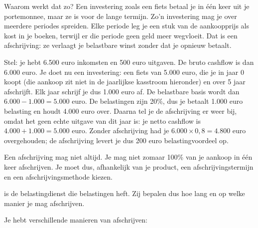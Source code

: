 \documentclass[a4paper,11pt]{article}
\begin{document}
Waarom werkt dat zo? Een investering zoals een fiets betaal je in één keer uit je portemonnee,
maar ze is voor de lange termijn. Zo'n investering mag je over
meerdere periodes spreiden. Elke periode leg je een stuk van de aankoopprijs als kost
in je boeken, terwijl er die periode geen geld meer wegvloeit.
Dat is een afschrijving: ze verlaagt je belastbare winst zonder dat je opnieuw betaalt.
\newline

Stel: je hebt 6.500 euro inkomsten en 500 euro uitgaven.
De bruto cashflow is dan 6.000 euro. Je doet nu een investering: een fiets van 5.000 euro,
die je in jaar 0 koopt (die aankoop zit niet in de jaarlijkse kasstroom hieronder)
en over 5 jaar afschrijft. Elk jaar schrijf je dus 1.000 euro af.
De belastbare basis wordt dan $6.000 - 1.000 = 5.000$ euro.
De belastingen zijn 20\%, dus je betaalt 1.000 euro belasting en houdt 4.000 euro over.
Daarna tel je de afschrijving er weer bij, omdat het geen echte uitgave van dit jaar is:
je netto cashflow is $4.000 + 1.000 = 5.000$ euro.
Zonder afschrijving had je $6.000 \times 0{,}8 = 4.800$ euro overgehouden;
de afschrijving levert je dus 200 euro belastingvoordeel op.
\newline

Een afschrijving mag niet altijd. Je mag niet zomaar 100\% van je aankoop in één keer afschrijven.
Je moet dus, afhankelijk van je product, een afschrijvingstermijn en een afschrijvingsmethode kiezen.
\newline

 is de belastingdienst die belastingen heft.
Zij bepalen dus hoe lang en op welke manier je mag afschrijven.
\newline

Je hebt verschillende manieren van afschrijven:
\end{document}
